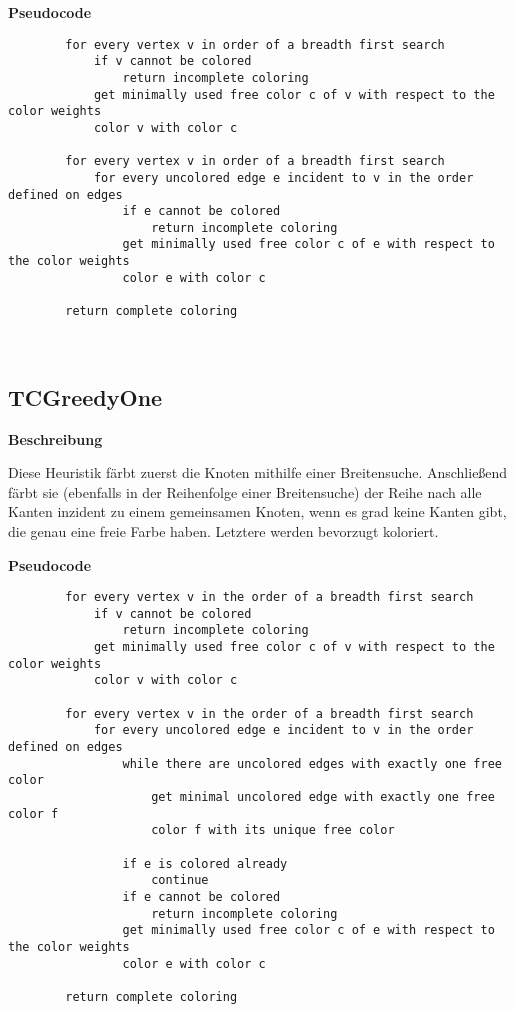\documentclass{article}
\begin{document}
	\textbf{Pseudocode}
	\begin{verbatim}
		for every vertex v in order of a breadth first search
		    if v cannot be colored
		        return incomplete coloring
		    get minimally used free color c of v with respect to the color weights
		    color v with color c
				    
		for every vertex v in order of a breadth first search
		    for every uncolored edge e incident to v in the order defined on edges
		        if e cannot be colored
		            return incomplete coloring
		        get minimally used free color c of e with respect to the color weights
		        color e with color c
				        
		return complete coloring
	\end{verbatim}
	
	~\newline
	
	\subsection{TCGreedyOne}
	
	\textbf{Beschreibung}
	
	Diese Heuristik färbt zuerst die Knoten mithilfe einer Breitensuche. Anschließend färbt sie (ebenfalls in der Reihenfolge einer Breitensuche) der Reihe nach alle Kanten inzident zu einem gemeinsamen Knoten, wenn es grad keine Kanten gibt, die genau eine freie Farbe haben. Letztere werden bevorzugt koloriert.
	
	\textbf{Pseudocode}
	\begin{verbatim}
		for every vertex v in the order of a breadth first search
		    if v cannot be colored
		        return incomplete coloring
		    get minimally used free color c of v with respect to the color weights
		    color v with color c
				    
		for every vertex v in the order of a breadth first search
		    for every uncolored edge e incident to v in the order defined on edges
		        while there are uncolored edges with exactly one free color
		            get minimal uncolored edge with exactly one free color f
		            color f with its unique free color
		            
		        if e is colored already
		            continue
		        if e cannot be colored
		            return incomplete coloring
		        get minimally used free color c of e with respect to the color weights
		        color e with color c
				        
		return complete coloring
	\end{verbatim}
		
\end{document}
